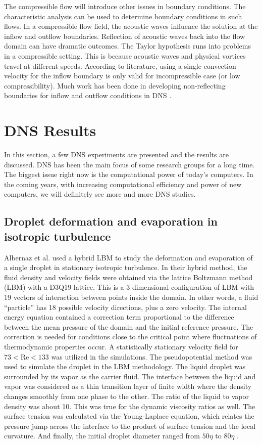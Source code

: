 \documentclass[12pt,oneside,a4paper,english]{article}
\begin{document}
The compressible flow will introduce other issues in boundary conditions. The characteristic analysis can be used to determine boundary conditions in such flows. In a compressible flow field, the acoustic waves influence the solution at the inflow and outflow boundaries. Reflection of acoustic waves back into the flow domain can have dramatic outcomes. The Taylor hypothesis runs into problems in a compressible setting. This is because acoustic waves and physical vortices travel at different speeds. According to literature, using a single convection velocity for the inflow boundary is only valid for incompressible case (or low compressibility). Much work has been done in developing non-reflecting boundaries for inflow and outflow conditions in DNS \cite{Kardashian1998}.

\section{DNS Results}
In this section, a few DNS experiments are presented and the results are discussed. DNS has been the main focus of some research groups for a long time. The biggest issue right now is the computational power of today's computers. In the coming years, with increasing computational efficiency and power of new computers, we will definitely see more and more DNS studies.

\subsection{Droplet deformation and evaporation in isotropic turbulence}
Albernaz et al. used a hybrid LBM to study the deformation and evaporation of a single droplet in stationary isotropic turbulence. In their hybrid method, the fluid density and velocity fields were obtained via the lattice Boltzmann method (LBM) with a D3Q19 lattice. This is a 3-dimensional configuration of  LBM with 19 vectors of interaction between points inside the domain. In other words, a fluid ``particle'' has 18 possible velocity directions, plus a zero velocity. The internal energy equation contained a correction term proportional to the difference between the mean pressure of the domain and the initial reference pressure. The correction is needed for conditions close to the critical point where fluctuations of thermodynamic properties occur. A statistically stationary velocity field for $73<\text{Re}<133$ was utilized in the simulations. The pseudopotential method was used to simulate the droplet in the LBM methodology. The liquid droplet was surrounded by its vapor as the carrier fluid. The interface between the liquid and vapor was considered as a thin transition layer of finite width where the density changes smoothly from one phase to the other. The ratio of the liquid to vapor density was about 10. This was true for the dynamic viscosity ratios as well. The surface tension was calculated via the Young-Laplace equation, which relates the pressure jump across the interface to the product of surface tension and the local curvature. And finally, the initial droplet diameter ranged from $50\eta$ to $80\eta$ \cite{albernaz2017droplet}.
\end{document}
